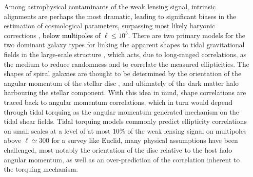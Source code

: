 \documentclass[a4paper,fleqn,usenatbib]{mnras}
\newcommand\spirou[1]{\textcolor{black}{#1}}
\begin{document}
Among astrophysical contaminants of the weak lensing signal, intrinsic alignments \citep{jing_intrinsic_2002, mackey_theoretical_2002, heymans_weak_2004, altay_influence_2006, kirk_impact_2010, massey_origins_2013, kitching_limits_2016} are perhaps the most dramatic, leading to significant biases in the estimation of cosmological parameters, surpassing most likely baryonic corrections \citep{white_baryons_2004, semboloni_quantifying_2011}, \spirou{below multipoles of $\ell\leq 10^3$}. There are two primary models for the two dominant galaxy types for linking the apparent shapes to tidal gravitational fields in the large-scale structure \citep{dubinski_cosmological_1992}, which acts, due to long-ranged correlations, as the medium to reduce randomness and to correlate the measured ellipticities. The shapes of spiral galaxies are thought to be determined by the orientation of the angular momentum of the stellar disc \citep{catelan_intrinsic_2001, crittenden_spin-induced_2001, bailin_internal_2005}, and ultimately of the dark matter halo harbouring the stellar component. With this idea in mind, shape correlations are traced back to angular momentum correlations, which in turn would depend through tidal torquing as the angular momentum generated mechanism on the tidal shear fields. Tidal torquing models commonly predict ellipticity correlations on small scales at a level of at most 10\% of the weak lensing signal on multipoles above $\ell\simeq300$ for a survey like Euclid, many physical assumptions have been challenged, most notably the orientation of the disc relative to the host halo angular momentum, as well as an over-prediction of the correlation inherent to the torquing mechanism.
\end{document}
